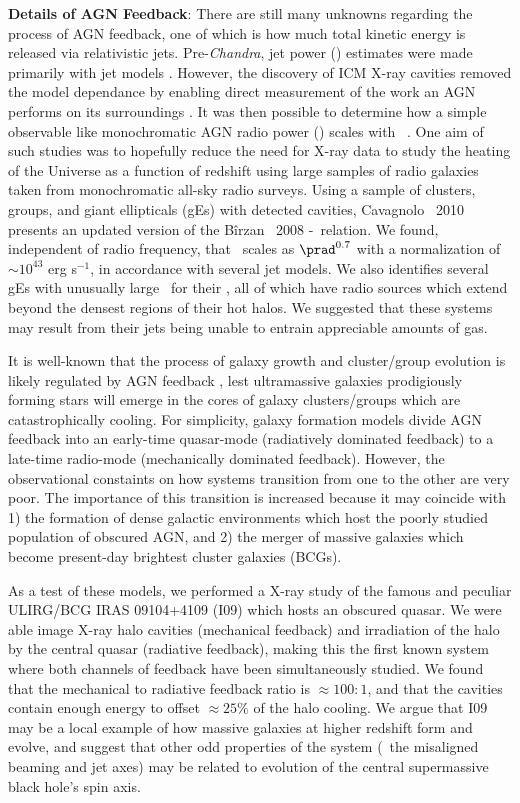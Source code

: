 \documentclass[letterpaper,12pt]{article}
\newcommand{\myhead}{Cavagnolo, Research Summary}
\begin{document}
{\bf Details of AGN Feedback}: There are still many unknowns regarding
the process of AGN feedback, one of which is how much total kinetic
energy is released via relativistic jets. Pre-{\it{Chandra}}, jet
power (\pjet) estimates were made primarily with jet models
\cite[\eg][]{w99}. However, the discovery of ICM X-ray cavities
\cite[\eg][]{hydraa0} removed the model dependance by enabling direct
measurement of the work an AGN performs on its surroundings
\cite{mcnamrev}. It was then possible to determine how a simple
observable like monochromatic AGN radio power (\prad) scales with
\pjet\ \cite[\eg][]{birzan04, birzan08}. One aim of such studies was
to hopefully reduce the need for X-ray data to study the heating of
the Universe as a function of redshift using large samples of radio
galaxies taken from monochromatic all-sky radio surveys. Using a
sample of clusters, groups, and giant ellipticals (gEs) with detected
cavities, Cavagnolo \etal\ 2010 presents an updated version of the
B\^irzan \etal\ 2008 \pjet-\prad\ relation. We found, independent of
radio frequency, that \pjet\ scales as $\prad^{0.7}$ with a
normalization of $\sim 10^{43}$ erg s$^{-1}$, in accordance with
several jet models. We also identifies several gEs with unusually
large \prad\ for their \pjet, all of which have radio sources which
extend beyond the densest regions of their hot halos. We suggested
that these systems may result from their jets being unable to entrain
appreciable amounts of gas.

It is well-known that the process of galaxy growth and cluster/group
evolution is likely regulated by AGN feedback
\cite[\eg][]{2005Natur.435..629S, croton06}, lest ultramassive
galaxies prodigiously forming stars will emerge in the cores of galaxy
clusters/groups which are catastrophically cooling. For simplicity,
galaxy formation models divide AGN feedback into an early-time
quasar-mode (radiatively dominated feedback) to a late-time radio-mode
(mechanically dominated feedback). However, the observational
constaints on how systems transition from one to the other are very
poor. The importance of this transition is increased because it may
coincide with 1) the formation of dense galactic environments which
host the poorly studied population of obscured AGN, and 2) the merger
of massive galaxies which become present-day brightest cluster
galaxies (BCGs).
\markright{\myhead}

As a test of these models, we performed a X-ray study of the famous
and peculiar ULIRG/BCG IRAS 09104+4109 (I09) which hosts an obscured
quasar. We were able image X-ray halo cavities (mechanical feedback)
and irradiation of the halo by the central quasar (radiative
feedback), making this the first known system where both channels of
feedback have been simultaneously studied. We found that the
mechanical to radiative feedback ratio is $\approx 100:1$, and that
the cavities contain enough energy to offset $\approx 25\%$ of the
halo cooling. We argue that I09 may be a local example of how massive
galaxies at higher redshift form and evolve, and suggest that other
odd properties of the system (\eg\ the misaligned beaming and jet
axes) may be related to evolution of the central supermassive black
hole's spin axis.
\end{document}
